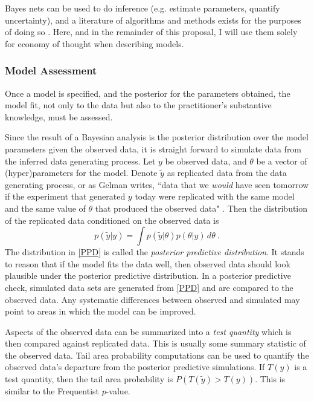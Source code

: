 Bayes nets can be used to do inference (e.g. estimate parameters, quantify uncertainty), and a literature of algorithms and methods exists for the purposes of doing so \cite{Bishop2006pattern,koller2009probabilistic}.  Here, and in the remainder of this proposal, I will use them solely for economy of thought when describing models.


\subsubsection{Model Assessment}

Once a model is specified, and the posterior for the parameters obtained, the model fit, not only to the data but also to the practitioner's substantive knowledge, must be assessed.  

Since the result of a Bayesian analysis is the posterior distribution over the model parameters given the observed data, it is straight forward to simulate data from the inferred data generating process.  Let $ y $ be observed data, and $ \theta $ be a vector of (hyper)parameters for the model.  Denote $ \tilde{y} $ as replicated data from the data generating process, or as Gelman writes, ``data that we \textit{would} have seen tomorrow if the experiment that generated $ y $ today were replicated with the same model and the same value of $ \theta $ that produced the observed data" \cite[page~145]{gelman2013bayesian}.  Then the distribution of the replicated data conditioned on the observed data is 
%
\begin{equation}\label{PPD}
	p(\tilde{y} \vert y) = \int p(\tilde{y} \vert \theta) p(\theta \vert y) \, d\theta  \>.
\end{equation}
%
The distribution in \cref{PPD} is called the \textit{posterior predictive distribution}.  It stands to reason that if the model fits the data well, then observed data should look plausible under the posterior predictive distribution. In a posterior predictive check, simulated data sets are generated from \cref{PPD} and are compared to the observed data.  Any systematic differences between observed and simulated may point to areas in which the model can be improved.

Aspects of the observed data can be summarized into a \textit{test quantity} \cite{gelman2013bayesian} which is then compared against replicated data. This is usually some summary statistic of the observed data. Tail area probability computations can be used to quantify  the observed data's departure from the posterior predictive simulations.  If $ T(y) $ is a test quantity, then the tail area probability is $ P(T(\tilde{y}) > T(y) ) $.  This is similar to the Frequentist $p$-value.


